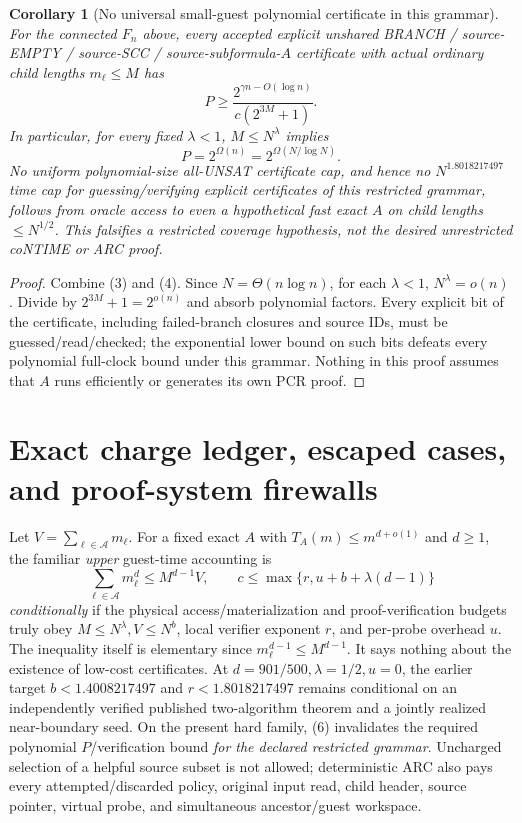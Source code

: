 \documentclass[11pt]{article}
\newtheorem{corollary}[theorem]{Corollary}
\begin{document}
\begin{corollary}[No universal small-guest polynomial certificate in this grammar]\label{cor:hard}
For the connected $F_n$ above, every accepted explicit unshared BRANCH / source-EMPTY / source-SCC / source-subformula-$A$ certificate with actual ordinary child lengths $m_\ell\le M$ has
\[
\boxed{\quad
P\ge \frac{2^{\gamma n-O(\log n)}}{c(2^{3M}+1)}.
\quad}
\tag{5}
\]
In particular, for every fixed $\lambda<1$, $M\le N^\lambda$ implies
\[
                 P=2^{\Omega(n)}=2^{\Omega(N/\log N)}.
\tag{6}
\]
No uniform polynomial-size all-UNSAT certificate cap, and hence no $N^{1.8018217497}$ time cap for guessing/verifying explicit certificates of this restricted grammar, follows from oracle access to even a hypothetical fast exact $A$ on child lengths $\le N^{1/2}$. This falsifies a restricted coverage hypothesis, not the desired unrestricted coNTIME or ARC proof.
\end{corollary}
\begin{proof}
Combine (3) and (4). Since $N=\Theta(n\log n)$, for each $\lambda<1$, $N^\lambda=o(n)$. Divide by $2^{3M}+1=2^{o(n)}$ and absorb polynomial factors. Every explicit bit of the certificate, including failed-branch closures and source IDs, must be guessed/read/checked; the exponential lower bound on such bits defeats every polynomial full-clock bound under this grammar. Nothing in this proof assumes that $A$ runs efficiently or generates its own PCR proof.
\end{proof}

\section{Exact charge ledger, escaped cases, and proof-system firewalls}
Let $V=\sum_{\ell\in\mathcal A}m_\ell$. For a fixed exact $A$ with $T_A(m)\le m^{d+o(1)}$ and $d\ge1$, the familiar \emph{upper} guest-time accounting is
\[
               \sum_{\ell\in\mathcal A}m_\ell^d\le M^{d-1}V,
\qquad
c\le\max\{r,u+b+\lambda(d-1)\}
\tag{7}
\]
\emph{conditionally} if the physical access/materialization and proof-verification budgets truly obey $M\le N^\lambda,V\le N^b$, local verifier exponent $r$, and per-probe overhead $u$. The inequality itself is elementary since $m_\ell^{d-1}\le M^{d-1}$. It says nothing about the existence of low-cost certificates. At $d=901/500,\lambda=1/2,u=0$, the earlier target $b<1.4008217497$ and $r<1.8018217497$ remains conditional on an independently verified published two-algorithm theorem and a jointly realized near-boundary seed. On the present hard family, (6) invalidates the required polynomial $P$/verification bound \emph{for the declared restricted grammar}. Uncharged selection of a helpful source subset is not allowed; deterministic ARC also pays every attempted/discarded policy, original input read, child header, source pointer, virtual probe, and simultaneous ancestor/guest workspace.
\end{document}
